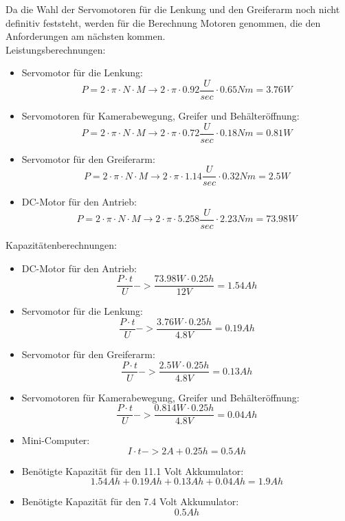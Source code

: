 Da die Wahl der Servomotoren für die Lenkung und den Greiferarm noch nicht definitiv feststeht, werden für die Berechnung Motoren genommen, die den Anforderungen am nächsten kommen.\\
Leistungsberechnungen:
\begin{itemize}
\item Servomotor für die Lenkung:
\[
P=2\cdot \pi\cdot N\cdot M \to 2\cdot \pi\cdot 0.92\frac{U}{sec}\cdot 0.65Nm = 3.76W
\]
\item Servomotoren für Kamerabewegung, Greifer und Behälteröffnung:
\[
P=2\cdot \pi\cdot N\cdot M \to 2\cdot \pi\cdot 0.72\frac{U}{sec}\cdot 0.18Nm = 0.81W
\]
\item Servomotor für den Greiferarm:
\[
P=2\cdot \pi\cdot N\cdot M \to 2\cdot \pi\cdot 1.14\frac{U}{sec}\cdot 0.32Nm = 2.5W
\]
\item DC-Motor für den Antrieb:
\[
P=2\cdot \pi\cdot N\cdot M \to 2\cdot \pi\cdot 5.258\frac{U}{sec}\cdot 2.23Nm = 73.98W
\]
\end{itemize}
Kapazitätenberechnungen:
\begin{itemize}
\item DC-Motor für den Antrieb:
\[
\frac{P\cdot t}{U} -> \frac{73.98W\cdot0.25h}{12V}= 1.54 Ah
\]
\item Servomotor für die Lenkung:
\[
\frac{P\cdot t}{U} -> \frac{3.76W\cdot0.25h}{4.8V}= 0.19 Ah
\]
\item Servomotor für den Greiferarm:
\[
\frac{P\cdot t}{U} -> \frac{2.5W\cdot0.25h}{4.8V}= 0.13 Ah
\]
\item Servomotoren für Kamerabewegung, Greifer und Behälteröffnung:
\[
\frac{P\cdot t}{U} -> \frac{0.814W\cdot0.25h}{4.8V}= 0.04 Ah
\]
\item Mini-Computer:
\[
I\cdot t -> 2A+0.25h = 0.5 Ah
\]
\item Benötigte Kapazität für den 11.1 Volt Akkumulator:
\[
1.54Ah+0.19Ah+0.13Ah+0.04Ah = 1.9Ah
\]
\item Benötigte Kapazität für den 7.4 Volt Akkumulator:
\[
0.5Ah
\]
\end{itemize}
